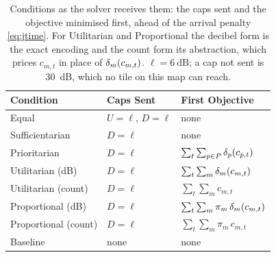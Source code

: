 \begin{table}[t]
\centering
\footnotesize
\caption{Conditions as the solver receives them: the caps sent and the objective
minimised first, ahead of the arrival penalty \eqref{eq:jtime}. For Utilitarian and Proportional
the decibel form is the exact encoding and the count form its abstraction, which prices
$c_{m,t}$ in place of $\delta_m(c_{m,t})$. $\ell=\SI{6}{\dB}$; a cap not sent is
\SI{30}{\dB}, which no tile on this map can reach.}
\label{tab:principles}
\begin{tabular}{@{}lll@{}}
\toprule
Condition & Caps Sent & First Objective \\
\midrule
Equal & $U{=}\ell$, $D{=}\ell$ & none \\
Sufficientarian & $D{=}\ell$ & none \\
Prioritarian & $D{=}\ell$ & $\sum_{t}\sum_{p\in P}\delta_p(c_{p,t})$ \\
Utilitarian (dB) & $D{=}\ell$ & $\sum_{t}\sum_{m}\delta_m(c_{m,t})$ \\
Utilitarian (count) & $D{=}\ell$ & $\sum_{t}\sum_{m} c_{m,t}$ \\
Proportional (dB) & $D{=}\ell$ & $\sum_{t}\sum_{m}\pi_m\,\delta_m(c_{m,t})$ \\
Proportional (count) & $D{=}\ell$ & $\sum_{t}\sum_{m}\pi_m\,c_{m,t}$ \\
Baseline & none & none \\
\bottomrule
\end{tabular}
\end{table}
